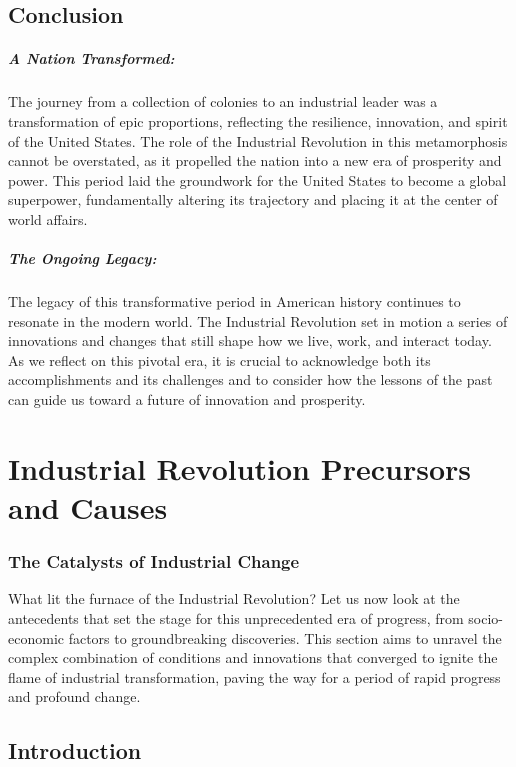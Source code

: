 \documentclass{book}
\begin{document}
\section*{Conclusion}

\paragraph{A Nation Transformed:}
The journey from a collection of colonies to an industrial leader was a transformation of epic proportions, reflecting the resilience, innovation, and spirit of the United States. The role of the Industrial Revolution in this metamorphosis cannot be overstated, as it propelled the nation into a new era of prosperity and power. This period laid the groundwork for the United States to become a global superpower, fundamentally altering its trajectory and placing it at the center of world affairs.

\paragraph{The Ongoing Legacy:}
The legacy of this transformative period in American history continues to resonate in the modern world. The Industrial Revolution set in motion a series of innovations and changes that still shape how we live, work, and interact today. As we reflect on this pivotal era, it is crucial to acknowledge both its accomplishments and its challenges and to consider how the lessons of the past can guide us toward a future of innovation and prosperity.

\chapter{Industrial Revolution Precursors and Causes}
\subsection*{The Catalysts of Industrial Change}
What lit the furnace of the Industrial Revolution? Let us now look at the antecedents that set the stage for this unprecedented era of progress, from socio-economic factors to groundbreaking discoveries. This section aims to unravel the complex combination of conditions and innovations that converged to ignite the flame of industrial transformation, paving the way for a period of rapid progress and profound change.

\section*{Introduction}
\end{document}
